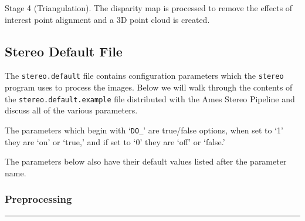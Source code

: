 Stage 4 (Triangulation). The disparity map is processed to remove
the effects of interest point alignment and a 3D point cloud is
created.


\subsection{Stereo Default File}
\label{stereo.default}

The \texttt{stereo.default} file contains configuration parameters
which the \texttt{stereo} program uses to process the images.  Below
we will walk through the contents of the \texttt{stereo.default.example}
file distributed with the Ames Stereo Pipeline and discuss all of
the various parameters.

The parameters which begin with `\texttt{DO\_}' are true/false options,
when set to `1' they are `on' or `true,' and if set to `0' they are
`off' or `false.'

The parameters below also have their default values listed after
the parameter name.

\subsubsection*{Preprocessing}
\hrule
\bigskip

